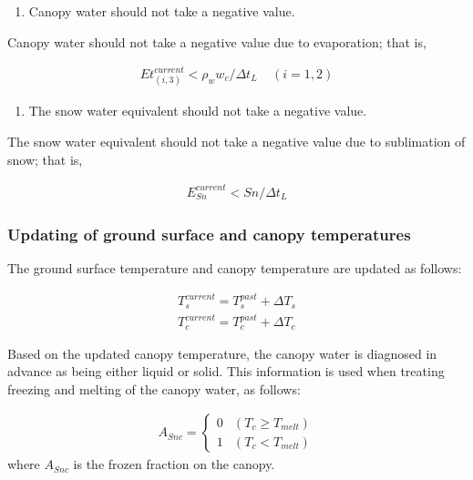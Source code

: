 \begin{enumerate}
\def\labelenumi{\arabic{enumi}.}
\setcounter{enumi}{2}
\tightlist
\item
  Canopy water should not take a negative value.
\end{enumerate}

Canopy water should not take a negative value due to evaporation; that is,

\begin{eqnarray}
   Et_{(i,3)}^{current} < \rho_w w_c /\Delta t_L
   \ \ \ \ \ (i=1,2)
\end{eqnarray}

\begin{enumerate}
\def\labelenumi{\arabic{enumi}.}
\setcounter{enumi}{3}
\tightlist
\item
  The snow water equivalent should not take a negative value.
\end{enumerate}

The snow water equivalent should not take a negative value due to sublimation of snow; that is,

\begin{eqnarray}
   E_{Sn}^{current} < Sn /\Delta t_L
\end{eqnarray}

\subsubsection{Updating of ground surface and canopy temperatures}\label{updating-of-ground-surface-and-canopy-temperatures}

The ground surface temperature and canopy temperature are updated as follows:

\begin{eqnarray}
 T_s^{current} = T_s^{past} + \Delta T_s \\
 T_c^{current} = T_c^{past} + \Delta T_c
\end{eqnarray}

Based on the updated canopy temperature, the canopy water is diagnosed in advance as being either liquid or solid. This information is used when treating freezing and melting of the canopy water, as
follows:

\begin{eqnarray}
 A_{Snc} = \left\{
\begin{array}{ll}
 0 & (T_c \geq T_{melt})\\
 1 & (T_c <    T_{melt})
\end{array}
\right.
\end{eqnarray} where \(A_{Snc}\) is the frozen fraction on the canopy.

